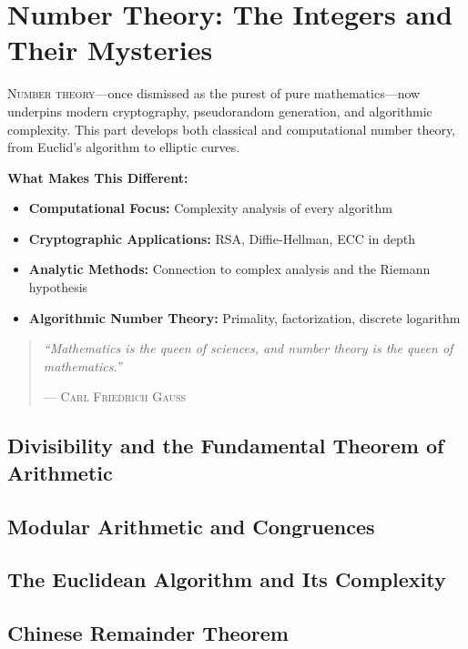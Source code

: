 \part{Number Theory: The Integers and Their Mysteries}
\label{part:number-theory}

\begin{partintro}
\lettrine[lines=3]{N}{umber theory}—once dismissed as the purest of pure mathematics—now underpins modern cryptography, pseudorandom generation, and algorithmic complexity. This part develops both classical and computational number theory, from Euclid's algorithm to elliptic curves.

\vspace{1em}
\textbf{What Makes This Different:}
\begin{itemize}[noitemsep]
    \item \textbf{Computational Focus:} Complexity analysis of every algorithm
    \item \textbf{Cryptographic Applications:} RSA, Diffie-Hellman, ECC in depth
    \item \textbf{Analytic Methods:} Connection to complex analysis and the Riemann hypothesis
    \item \textbf{Algorithmic Number Theory:} Primality, factorization, discrete logarithm
\end{itemize}

\begin{quote}
\textit{``Mathematics is the queen of sciences, and number theory is the queen of mathematics.''}

\hfill--- \textsc{Carl Friedrich Gauss}
\end{quote}
\end{partintro}

\chapter{Divisibility and the Fundamental Theorem of Arithmetic}
\chapter{Modular Arithmetic and Congruences}
\chapter{The Euclidean Algorithm and Its Complexity}
\chapter{Chinese Remainder Theorem}
